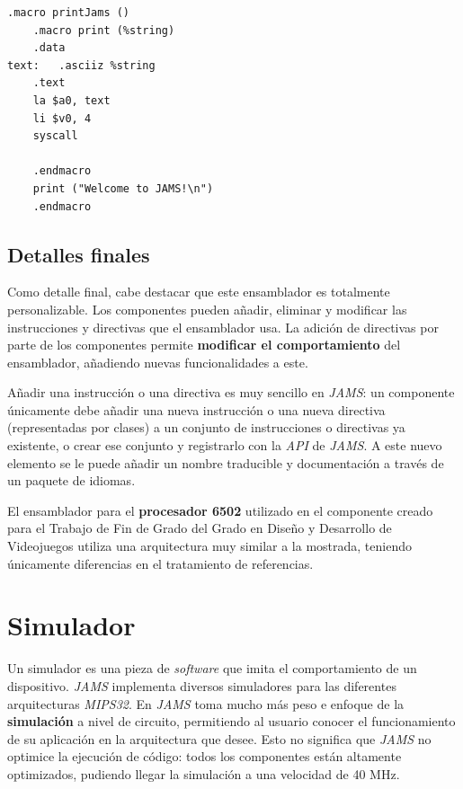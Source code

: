 \begin{lstlisting}[frame=single,label={lst:nested-macro}]
    .macro printJams ()
    .macro print (%string)
    .data
text:   .asciiz %string
    .text
    la $a0, text
    li $v0, 4
    syscall

    .endmacro
    print ("Welcome to JAMS!\n")
    .endmacro
\end{lstlisting}

\subsection{Detalles finales}\label{subsec:detalles-finales}

Como detalle final, cabe destacar que este ensamblador es totalmente personalizable.
Los componentes pueden añadir, eliminar y modificar las instrucciones y directivas
que el ensamblador usa.
La adición de directivas por parte de los componentes permite
\textbf{modificar el comportamiento} del ensamblador, añadiendo
nuevas funcionalidades a este.

Añadir una instrucción o una directiva es muy sencillo en \textit{JAMS}:
un componente únicamente debe añadir una nueva instrucción o
una nueva directiva (representadas por clases) a un conjunto de
instrucciones o directivas ya existente, o crear ese conjunto y registrarlo
con la \textit{API} de \textit{JAMS}.
A este nuevo elemento se le puede añadir un nombre traducible y documentación
a través de un paquete de idiomas.

El ensamblador para el \textbf{procesador 6502} utilizado en el
componente creado para el Trabajo de Fin de Grado del Grado en Diseño
y Desarrollo de Videojuegos utiliza una arquitectura muy similar a la mostrada,
teniendo únicamente diferencias en el tratamiento de referencias.

\section{Simulador}\label{sec:simulador}

Un simulador es una pieza de \textit{software} que imita el comportamiento
de un dispositivo.
\textit{JAMS} implementa diversos simuladores para las diferentes
arquitecturas \textit{MIPS32}.
En \textit{JAMS} toma mucho más peso e enfoque de la
\textbf{simulación} a nivel de circuito, permitiendo al usuario
conocer el funcionamiento de su aplicación en la arquitectura que desee.
Esto no significa que \textit{JAMS} no optimice la ejecución de código:
todos los componentes están altamente optimizados, pudiendo llegar
la simulación a una velocidad de 40 MHz.

